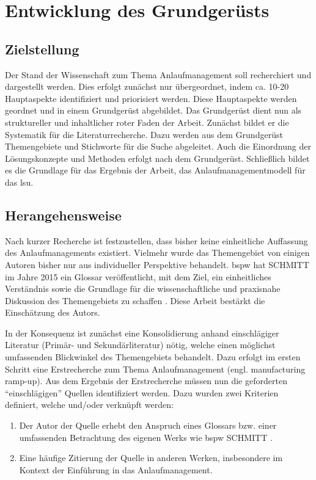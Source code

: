 \section{Entwicklung des Grundgerüsts}\label{sec:grundgeruest}
\subsection*{Zielstellung}

Der Stand der Wissenschaft zum Thema Anlaufmanagement soll recherchiert und dargestellt werden. Dies erfolgt zunächst nur übergeordnet, indem ca. 10-20 Hauptaspekte identifiziert und priorisiert werden. Diese Hauptaspekte werden geordnet und in einem Grundgerüst abgebildet. Das Grundgerüst dient nun als struktureller und inhaltlicher roter Faden der Arbeit. 
Zunächst bildet er die Systematik für die Literaturrecherche. Dazu werden aus dem Grundgerüst Themengebiete und Stichworte für die Suche abgeleitet. 
Auch die Einordnung der Lösungskonzepte und Methoden erfolgt nach dem Grundgerüst. %
Schließlich bildet es die Grundlage für das Ergebnis der Arbeit, das Anlaufmanagementmodell für das \gls{lsu}. %

\subsection*{Herangehensweise}\label{sec:herangehensweise_gg}

Nach kurzer Recherche ist festzustellen, dass bisher keine einheitliche Auffassung des Anlaufmanagements existiert. Vielmehr wurde das Themengebiet von einigen Autoren bisher nur aus individueller Perspektive behandelt. 
\Gls{bspw} hat SCHMITT im Jahre 2015 ein Glossar veröffentlicht, mit dem Ziel, ein einheitliches Verständnis sowie die Grundlage für die wissenschaftliche und praxisnahe Diskussion des Themengebiets zu schaffen \cite{Schmitt2015}. Diese Arbeit bestärkt die Einschätzung des Autors. %

In der Konsequenz ist zunächst eine Konsolidierung anhand einschlägiger Literatur (Primär- und Sekundärliteratur) nötig, welche einen möglichst umfassenden Blickwinkel des Themengebiets behandelt. Dazu erfolgt im ersten Schritt eine Erstrecherche zum Thema Anlaufmanagement (engl. manufacturing ramp-up). Aus dem Ergebnis der Erstrecherche müssen nun die geforderten ``einschlägigen'' Quellen identifiziert werden. Dazu wurden zwei Kriterien definiert, welche und/oder verknüpft werden: 
\begin{enumerate}
 \item Der Autor der Quelle erhebt den Anspruch eines Glossars bzw. einer umfassenden Betrachtung des eigenen Werks wie \gls{bspw} SCHMITT \cite{Schmitt2015}. %
 \item Eine häufige Zitierung der Quelle in anderen Werken, insbesondere im Kontext der Einführung in das Anlaufmanagement. %
\end{enumerate}

